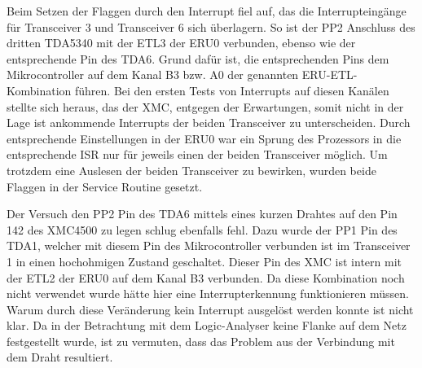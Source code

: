 Beim Setzen der Flaggen durch den Interrupt fiel auf, das die Interrupteingänge für Transceiver 3 und Transceiver 6 sich überlagern. So ist der PP2 Anschluss des dritten TDA5340 mit der \ac{ETL}3 der \ac{ERU}0 verbunden, ebenso wie der entsprechende Pin des TDA6. Grund dafür ist, die entsprechenden Pins dem Mikrocontroller auf dem Kanal B3 bzw. A0 der genannten \ac{ERU}-\ac{ETL}-Kombination führen. Bei den ersten Tests von Interrupts auf diesen Kanälen stellte sich heraus, das der XMC, entgegen der Erwartungen, somit nicht in der Lage ist ankommende Interrupts der beiden Transceiver zu unterscheiden. Durch entsprechende Einstellungen in der \ac{ERU}0 war ein Sprung des Prozessors in die entsprechende \acl{ISR} nur für jeweils einen der beiden Transceiver möglich. Um trotzdem eine Auslesen der beiden Transceiver zu bewirken, wurden beide Flaggen in der Service Routine gesetzt.

Der Versuch den PP2 Pin des TDA6 mittels eines kurzen Drahtes auf den Pin 142 des XMC4500 zu legen schlug ebenfalls fehl. Dazu wurde der PP1 Pin des TDA1, welcher mit diesem Pin des Mikrocontroller verbunden ist im Transceiver 1 in einen hochohmigen Zustand geschaltet. Dieser Pin des XMC ist intern mit der \ac{ETL}2 der \ac{ERU}0 auf dem Kanal B3 verbunden. Da diese Kombination noch nicht verwendet wurde hätte hier eine Interrupterkennung funktionieren müssen. Warum durch diese Veränderung kein Interrupt ausgelöst werden konnte ist nicht klar. Da in der Betrachtung mit dem Logic-Analyser keine Flanke auf dem Netz festgestellt wurde, ist zu vermuten, dass das Problem aus der Verbindung mit dem Draht resultiert.



